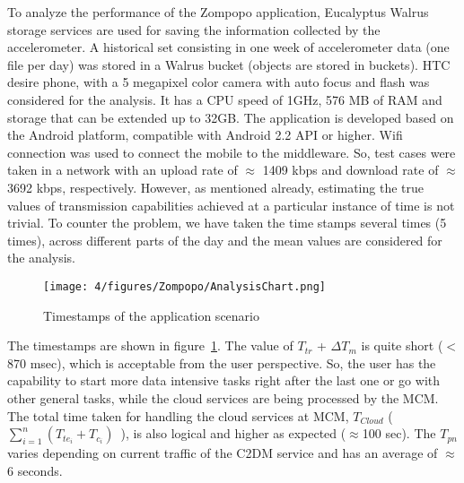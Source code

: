 To analyze the performance of the Zompopo application, Eucalyptus Walrus storage services are used for saving the information collected by the accelerometer. A historical set consisting in one week of accelerometer data (one file per day) was stored in a Walrus bucket (objects are stored in buckets). HTC desire phone, with a 5 megapixel color camera with auto focus and flash was considered for the analysis. It has a CPU speed of 1GHz, 576 MB of RAM and storage that can be extended up to 32GB. The application is developed based on the Android platform, compatible with Android 2.2 API or higher. Wifi connection was used to connect the mobile to the middleware. So, test cases were taken in a network with an upload rate of $\approx$ 1409 kbps and download rate of $\approx$ 3692 kbps, respectively. However, as mentioned already, estimating the true values of transmission capabilities achieved at a particular instance of time is not trivial. To counter the problem, we have taken the time stamps several times (5 times), across different parts of the day and the mean values are considered for the analysis.

\begin{figure}
\centering
\texttt{[image: 4/figures/Zompopo/AnalysisChart.png]}
\caption{Timestamps of the application scenario}
\label{fig:AnalysisChart}
\end{figure}

The timestamps are shown in figure~\ref{fig:AnalysisChart}. The value of $T_{tr}$ + $\Delta T_m$ is quite short ($<$ 870 msec), which is acceptable from the user perspective. So, the user has the capability to start more data intensive tasks right after the last one or go with other general tasks, while the cloud services are being processed by the MCM. The total time taken for handling the cloud services at MCM, $T_{Cloud}$ (~$\sum_{i=1}^n (T_{{te}_i} + T_{c_i})$~), is also logical and higher as expected ($\approx$100 sec). The $T_{pn}$ varies depending on current traffic of the C2DM service and has an average of $\approx$6 seconds.







